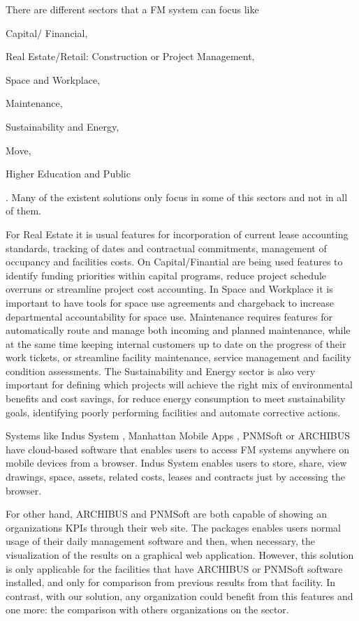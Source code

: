 There are different sectors that a FM system can focus like 
\begin{enumerate*}[label=\itshape\roman{enumi})]
	\item Capital/ Financial,
	\item Real Estate/Retail: Construction or Project Management,
	\item Space and Workplace, 
	\item Maintenance, 
	\item Sustainability and Energy,
	\item Move,
	\item Higher Education and Public 
\end{enumerate*}. Many of the existent solutions only focus in some of this sectors and not in all of them.

For Real Estate it is usual features for incorporation of current lease accounting standards, tracking of dates and contractual commitments, management of occupancy and facilities costs. 
On Capital/Finantial are being used features to identify funding priorities within capital programs, reduce project schedule overruns or streamline project cost accounting.
In Space and Workplace it is important to have tools for space use agreements and chargeback to increase departmental accountability for space use.
Maintenance requires features for automatically route and manage both incoming and planned maintenance, while at the same time keeping internal customers up to date on the progress of their work tickets, or streamline facility maintenance, service management and facility condition assessments. 
The Sustainability and Energy sector is also very important for defining which projects will achieve the right mix of environmental benefits and cost savings, for reduce energy consumption to meet sustainability goals, identifying poorly performing facilities and automate corrective actions.

Systems like Indus System \cite{IndusSystems}, Manhattan Mobile Apps \cite{ManhattanAppMobile}, PNMSoft \cite{pnmSoftsite} or ARCHIBUS have cloud-based software that enables users to access FM systems anywhere on mobile devices from a browser.
Indus System enables users to store, share, view drawings, space, assets, related costs, leases and contracts just by accessing the browser.

For other hand, ARCHIBUS and PNMSoft are both capable of showing an organizations KPIs through their web site. The packages enables users normal usage of their daily management software and then, when necessary, the visualization of the results on a graphical web application.
However, this solution is only applicable for the facilities that have ARCHIBUS or PNMSoft software installed, and only for comparison from previous results from that facility.
In contrast, with our solution, any organization could benefit from this features and one more: the comparison with others organizations on the sector.

